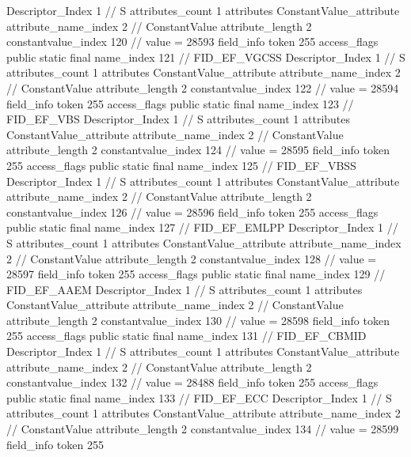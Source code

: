 {{{{{				Descriptor_Index	1		// S
				attributes_count	1
				attributes {
				ConstantValue_attribute {
					attribute_name_index	2		// ConstantValue
					attribute_length	2
					constantvalue_index	120		// value = 28593
				}
				}
			}
			field_info {
				token	255
				access_flags	public static final
				name_index	121		// FID_EF_VGCSS
				Descriptor_Index	1		// S
				attributes_count	1
				attributes {
				ConstantValue_attribute {
					attribute_name_index	2		// ConstantValue
					attribute_length	2
					constantvalue_index	122		// value = 28594
				}
				}
			}
			field_info {
				token	255
				access_flags	public static final
				name_index	123		// FID_EF_VBS
				Descriptor_Index	1		// S
				attributes_count	1
				attributes {
				ConstantValue_attribute {
					attribute_name_index	2		// ConstantValue
					attribute_length	2
					constantvalue_index	124		// value = 28595
				}
				}
			}
			field_info {
				token	255
				access_flags	public static final
				name_index	125		// FID_EF_VBSS
				Descriptor_Index	1		// S
				attributes_count	1
				attributes {
				ConstantValue_attribute {
					attribute_name_index	2		// ConstantValue
					attribute_length	2
					constantvalue_index	126		// value = 28596
				}
				}
			}
			field_info {
				token	255
				access_flags	public static final
				name_index	127		// FID_EF_EMLPP
				Descriptor_Index	1		// S
				attributes_count	1
				attributes {
				ConstantValue_attribute {
					attribute_name_index	2		// ConstantValue
					attribute_length	2
					constantvalue_index	128		// value = 28597
				}
				}
			}
			field_info {
				token	255
				access_flags	public static final
				name_index	129		// FID_EF_AAEM
				Descriptor_Index	1		// S
				attributes_count	1
				attributes {
				ConstantValue_attribute {
					attribute_name_index	2		// ConstantValue
					attribute_length	2
					constantvalue_index	130		// value = 28598
				}
				}
			}
			field_info {
				token	255
				access_flags	public static final
				name_index	131		// FID_EF_CBMID
				Descriptor_Index	1		// S
				attributes_count	1
				attributes {
				ConstantValue_attribute {
					attribute_name_index	2		// ConstantValue
					attribute_length	2
					constantvalue_index	132		// value = 28488
				}
				}
			}
			field_info {
				token	255
				access_flags	public static final
				name_index	133		// FID_EF_ECC
				Descriptor_Index	1		// S
				attributes_count	1
				attributes {
				ConstantValue_attribute {
					attribute_name_index	2		// ConstantValue
					attribute_length	2
					constantvalue_index	134		// value = 28599
				}
				}
			}
			field_info {
				token	255
}}}}}
